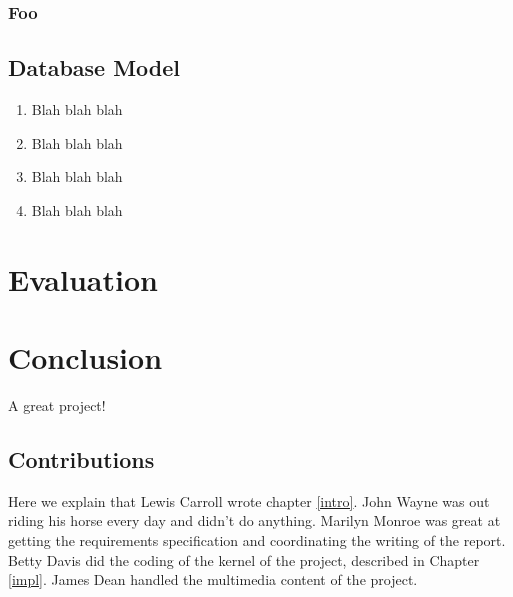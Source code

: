 \documentclass{l3proj}
\begin{document}
\subsection{Foo}

\section{Database Model}

\begin{enumerate}
\item Blah blah blah
\item Blah blah blah
\item Blah blah blah
\item Blah blah blah
\end{enumerate}



\chapter{Evaluation}
\chapter{Conclusion}

A great project!

\section{Contributions}

Here we explain that Lewis Carroll wrote chapter \ref{intro}. John Wayne
was out riding his horse every day and didn't do anything. Marilyn Monroe
was great at getting the requirements specification and coordinating the
writing of the report. Betty Davis did the coding of the kernel of the
project, described in Chapter \ref{impl}.  James Dean handled the
multimedia content of the project.



\end{document}
